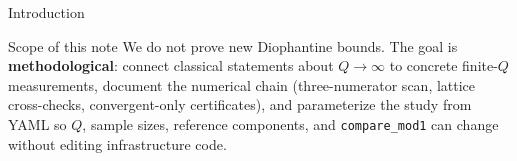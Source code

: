 \documentclass[
  ignorenonframetext,
]{beamer}
\begin{document}
\begin{frame}[fragile]{Introduction}
\begin{block}{Scope of this note}
\protect{}\label{scope-of-this-note}
We do not prove new Diophantine bounds. The goal is
\textbf{methodological}: connect classical statements about
\(Q\to\infty\) to concrete finite-\(Q\) measurements, document the
numerical chain (three-numerator scan, lattice cross-checks,
convergent-only certificates), and parameterize the study from YAML so
\(Q\), sample sizes, reference components, and \texttt{compare\_mod1}
can change without editing infrastructure code.
\end{block}
\end{frame}
\end{document}
